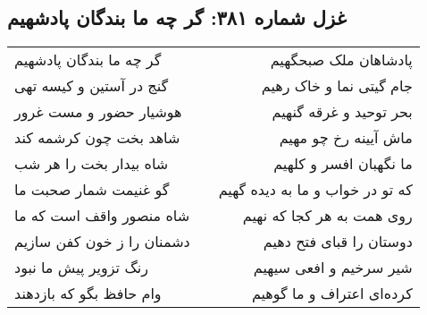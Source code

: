 \begin{center}
\section*{غزل شماره ۳۸۱: گر چه ما بندگان پادشهیم}
\label{sec:sh381}
\begin{longtable}{l p{0.5cm} r}
گر چه ما بندگان پادشهیم
&&
پادشاهان ملک صبحگهیم
\\
گنج در آستین و کیسه تهی
&&
جام گیتی نما و خاک رهیم
\\
هوشیار حضور و مست غرور
&&
بحر توحید و غرقه گنهیم
\\
شاهد بخت چون کرشمه کند
&&
ماش آیینه رخ چو مهیم
\\
شاه بیدار بخت را هر شب
&&
ما نگهبان افسر و کلهیم
\\
گو غنیمت شمار صحبت ما
&&
که تو در خواب و ما به دیده گهیم
\\
شاه منصور واقف است که ما
&&
روی همت به هر کجا که نهیم
\\
دشمنان را ز خون کفن سازیم
&&
دوستان را قبای فتح دهیم
\\
رنگ تزویر پیش ما نبود
&&
شیر سرخیم و افعی سیهیم
\\
وام حافظ بگو که بازدهند
&&
کرده‌ای اعتراف و ما گوهیم
\\
\end{longtable}
\end{center}
